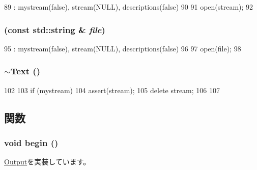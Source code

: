 \begin{DoxyCode}
89     : mystream(false), stream(NULL), descriptions(false)
90 {
91     open(stream);
92 }
\end{DoxyCode}
\hypertarget{classStats_1_1Text_a058d85cf42499e3db5f5baad5d7f644a}{
\subsubsection[{Text}]{ (const std::string \& {\em file})}}
\label{classStats_1_1Text_a058d85cf42499e3db5f5baad5d7f644a}



\begin{DoxyCode}
95     : mystream(false), stream(NULL), descriptions(false)
96 {
97     open(file);
98 }
\end{DoxyCode}
\hypertarget{classStats_1_1Text_a8bbff8b26bfd195b340d303ffa9b121b}{
\subsubsection[{$\sim$Text}]{\setlength{\rightskip}{0pt plus 5cm}$\sim${\bf Text} ()}}
\label{classStats_1_1Text_a8bbff8b26bfd195b340d303ffa9b121b}



\begin{DoxyCode}
102 {
103     if (mystream) {
104         assert(stream);
105         delete stream;
106     }
107 }
\end{DoxyCode}


\subsection{関数}
\hypertarget{classStats_1_1Text_ab0bdf5cca484fb2ba637c39384b27fb2}{
\subsubsection[{begin}]{\setlength{\rightskip}{0pt plus 5cm}void begin ()}}
\label{classStats_1_1Text_ab0bdf5cca484fb2ba637c39384b27fb2}


\hyperlink{structStats_1_1Output_aaf893c33f3c041e289a12c153dcc9789}{Output}を実装しています。


